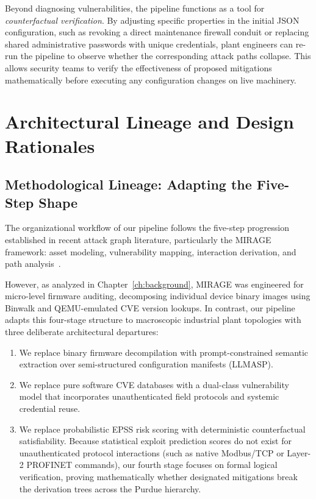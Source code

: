 \documentclass[target=mst,aauheader=aics,style=]{thud}
\begin{document}
Beyond diagnosing vulnerabilities, the pipeline functions as a tool for \textit{counterfactual verification}. By adjusting specific properties in the initial JSON configuration, such as revoking a direct maintenance firewall conduit or replacing shared administrative passwords with unique credentials, plant engineers can re-run the pipeline to observe whether the corresponding attack paths collapse. This allows security teams to verify the effectiveness of proposed mitigations mathematically before executing any configuration changes on live machinery.

\section{Architectural Lineage and Design Rationales}
\label{sec:design_rationales}

\subsection{Methodological Lineage: Adapting the Five-Step Shape}
The organizational workflow of our pipeline follows the five-step progression established in recent attack graph literature, particularly the MIRAGE framework: asset modeling, vulnerability mapping, interaction derivation, and path analysis~\cite{TayouriMIRAGE}.

However, as analyzed in Chapter~\ref{ch:background}, MIRAGE was engineered for micro-level firmware auditing, decomposing individual device binary images using Binwalk and QEMU-emulated CVE version lookups. In contrast, our pipeline adapts this four-stage structure to macroscopic industrial plant topologies with three deliberate architectural departures:
\begin{enumerate}
    \item We replace binary firmware decompilation with prompt-constrained semantic extraction over semi-structured configuration manifests (LLMASP).
    \item We replace pure software CVE databases with a dual-class vulnerability model that incorporates unauthenticated field protocols and systemic credential reuse.
    \item We replace probabilistic EPSS risk scoring with deterministic counterfactual satisfiability. Because statistical exploit prediction scores do not exist for unauthenticated protocol interactions (such as native Modbus/TCP or Layer-2 PROFINET commands), our fourth stage focuses on formal logical verification, proving mathematically whether designated mitigations break the derivation trees across the Purdue hierarchy.
\end{enumerate}
\end{document}
